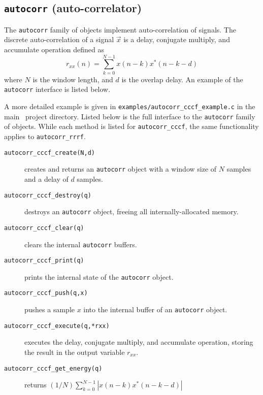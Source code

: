 \subsection{{\tt autocorr} (auto-correlator)}
\label{module:filter:autocorr}
The {\tt autocorr} family of objects implement auto-correlation of
signals.
The discrete auto-correlation of a signal $\vec{x}$
is a delay, conjugate multiply, and accumulate operation defined as
%
\begin{equation}
\label{eqn:filter:autocorr}
    r_{xx}(n) = \sum_{k=0}^{N-1} {x(n-k)x^*(n-k-d)}
\end{equation}
%
where $N$ is the window length, and $d$ is the overlap delay.
An example of the {\tt autocorr} interface is listed below.
%

%
A more detailed example is given in
{\tt examples/autocorr\_cccf\_example.c}
in the main \liquid\ project directory.
%
Listed below is the full interface to the {\tt autocorr} family of
objects.
While each method is listed for {\tt autocorr\_cccf}, the same
functionality applies to {\tt autocorr\_rrrf}.
%
\begin{description}
\item[{\tt autocorr\_cccf\_create(N,d)}]
    creates and returns an {\tt autocorr} object with a window size of
    $N$ samples and a delay of $d$ samples.
\item[{\tt autocorr\_cccf\_destroy(q)}]
    destroys an {\tt autocorr} object, freeing all internally-allocated
    memory.
\item[{\tt autocorr\_cccf\_clear(q)}]
    clears the internal {\tt autocorr} buffers.
\item[{\tt autocorr\_cccf\_print(q)}]
    prints the internal state of the {\tt autocorr} object.
\item[{\tt autocorr\_cccf\_push(q,x)}]
    pushes a sample $x$ into the internal buffer of an {\tt autocorr}
    object.
\item[{\tt autocorr\_cccf\_execute(q,*rxx)}]
    executes the delay, conjugate multiply, and accumulate operation,
    storing the result in the output variable $r_{xx}$.
\item[{\tt autocorr\_cccf\_get\_energy(q)}]
    returns $(1/N)\sum_{k=0}^{N-1}{|x(n-k)x^*(n-k-d)|}$
\end{description}



% 
%
